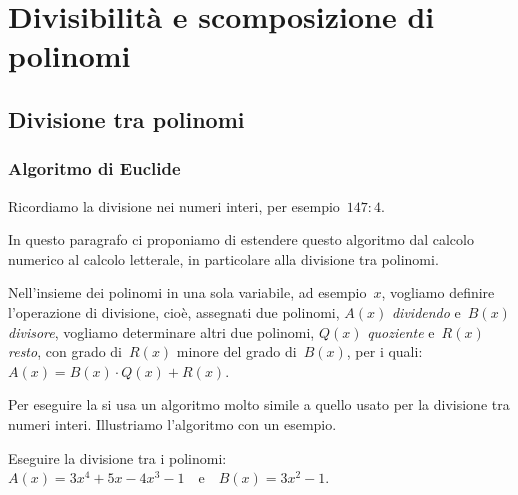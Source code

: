 


\chapter{Divisibilità e scomposizione di polinomi}

\section{Divisione tra polinomi}

\subsection{Algoritmo di Euclide}
\label{subsec:divpol_divisione_euclide}

Ricordiamo la divisione nei numeri interi, per esempio~\(147:4\). 


In questo paragrafo ci proponiamo di estendere questo algoritmo dal calcolo 
numerico al calcolo letterale, in particolare alla divisione tra polinomi.

Nell'insieme dei polinomi in una sola variabile, ad esempio~\(x\), vogliamo 
definire l'operazione di divisione, cioè, assegnati due polinomi, 
\(A(x)\) \emph{dividendo} e~\(B(x)\) \emph{divisore}, vogliamo determinare 
altri due polinomi, \(Q(x)\) \emph{quoziente} e~\(R(x)\) \emph{resto},
con grado di~\(R(x)\) minore del grado di~\(B(x)\), per i 
quali:~\(A(x) = B(x){\cdot}Q(x) + R(x)\).

Per eseguire la  
si usa un algoritmo molto simile a quello usato per la divisione tra numeri 
interi. 
Illustriamo l'algoritmo con un esempio.

\begin{esempio}{}{}
Eseguire la divisione tra i polinomi: \\
\(A(x)=3x^4+5x-4x^3-1\)~~e~~\(B(x)=3x^2-1\).
\end{esempio}

